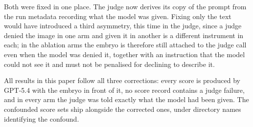 Both were fixed in one place. The judge now derives its copy of the prompt from
the run metadata recording what the model was given. Fixing only the text would
have introduced a third asymmetry, this time in the judge, since a judge denied
the image in one arm and given it in another is a different instrument in each;
in the ablation arms the embryo is therefore still attached to the judge call
even when the model was denied it, together with an instruction that the model
could not see it and must not be penalised for declining to describe it.

All results in this paper follow all three corrections: every score is produced
by GPT-5.4 with the embryo in front of it, no score record contains a judge
failure, and in every arm the judge was told exactly what the model had been
given. The confounded score sets ship alongside the corrected ones, under
directory names identifying the confound.
